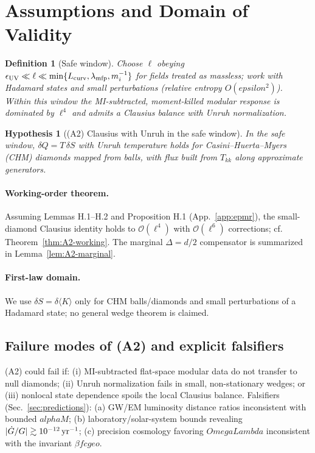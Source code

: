 \documentclass[aps,prd,onecolumn,superscriptaddress,nofootinbib]{revtex4-2}
\def\OmL{OmegaLambda}%
\def\cgeo{cgeo}%
\def\alphaM{alphaM}%
\def\eps{epsilon}%
\newcommand{\OmL}{\Omega_\Lambda}
\newcommand{\cgeo}{c_{\rm geo}}
\newcommand{\alphaM}{\alpha_M}
\newcommand{\eps}{\varepsilon}
\newtheorem{definition}{Definition}
\newtheorem{hypothesis}{Hypothesis}
\begin{document}
\section{Assumptions and Domain of Validity}
\label{sec:assumptions}

\begin{definition}[Safe window]
\label{def:safe-window}
Choose $\ell$ obeying $\epsilon_{\rm UV}\ll \ell \ll \min\{L_{\rm curv},\lambda_{\rm mfp},m_i^{-1}\}$ for fields treated as massless; work with Hadamard states and small perturbations (relative entropy $O(\eps^2)$). Within this window the MI-subtracted, moment-killed modular response is dominated by $\ell^4$ and admits a Clausius balance with Unruh normalization.
\end{definition}

\begin{hypothesis}[(A2) Clausius with Unruh in the safe window]
\label{hyp:A2}
In the safe window, $\delta Q=T\,\delta S$ with Unruh temperature holds for \emph{Casini--Huerta--Myers (CHM)} diamonds mapped from balls, with flux built from $T_{kk}$ along approximate generators.
\end{hypothesis}

\paragraph{Working-order theorem.} Assuming Lemmas H.1–H.2 and Proposition H.1 (App.~\ref{app:epmr}), the small-diamond Clausius identity holds to $\mathcal O(\ell^4)$ with $\mathcal O(\ell^6)$ corrections; cf. Theorem~\ref{thm:A2-working}. The marginal $\Delta=d/2$ compensator is summarized in Lemma~\ref{lem:A2-marginal}.

\paragraph{First-law domain.} We use $\delta S=\delta\langle K\rangle$ only for CHM balls/diamonds and small perturbations of a Hadamard state; no general wedge theorem is claimed.

\subsection{Failure modes of (A2) and explicit falsifiers}
\label{sec:a2-fail}
(A2) could fail if: (i) MI-subtracted flat-space modular data do not transfer to null diamonds; (ii) Unruh normalization fails in small, non-stationary wedges; or (iii) nonlocal state dependence spoils the local Clausius balance. Falsifiers (Sec.~\ref{sec:predictions}): (a) GW/EM luminosity distance ratios inconsistent with bounded $\alphaM$; (b) laboratory/solar-system bounds revealing $|\dot G/G|\gtrsim 10^{-12}\,{\rm yr}^{-1}$; (c) precision cosmology favoring $\OmL$ inconsistent with the invariant $\beta f \cgeo$.
\end{document}
